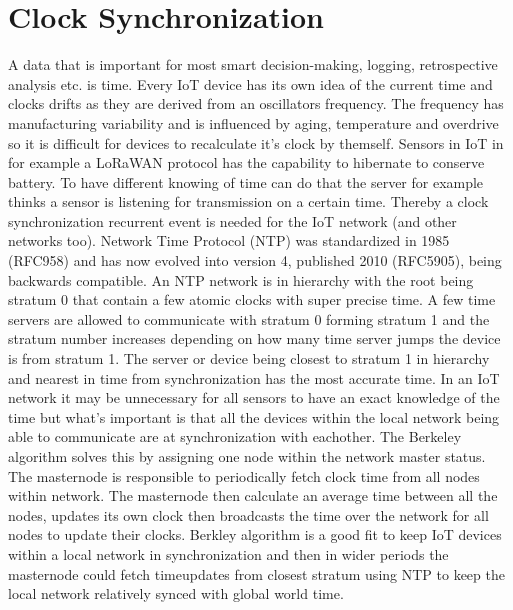 \documentclass[article,a4paper]{IEEEtran}
\begin{document}
\section{Clock Synchronization}
A data that is important for most smart decision-making, logging, retrospective analysis etc. is time. Every IoT device has its own idea of the current time and clocks drifts as they are derived from an oscillators frequency. The frequency has manufacturing variability and is influenced by aging, temperature and overdrive so it is difficult for devices to recalculate it's clock by themself. Sensors in IoT in for example a LoRaWAN protocol has the capability to hibernate to conserve battery. To have different knowing of time can do that the server for example thinks a sensor is listening for transmission on a certain time. Thereby a clock synchronization recurrent event is needed for the IoT network (and other networks too).   
\newline\newline 
Network Time Protocol (NTP) \cite{NTPv4} was standardized in 1985 (RFC958) and has now evolved into version 4, published 2010 (RFC5905), being backwards compatible. An NTP network is in hierarchy with the root being stratum 0 that contain a few atomic clocks with super precise time. A few time servers are allowed to communicate with stratum 0 forming stratum 1 and the stratum number increases depending on how many time server jumps the device is from stratum 1. The server or device being closest to stratum 1 in hierarchy and nearest in time from synchronization has the most accurate time. In an IoT network it may be unnecessary for all sensors to have an exact knowledge of the time but what's important is that all the devices within the local network being able to communicate are at synchronization with eachother. 
\newline\newline
The Berkeley algorithm \cite{Berkleyalgo} solves this by assigning one node within the network master status. The masternode is responsible to periodically fetch clock time from all nodes within network. The masternode then calculate an average time between all the nodes, updates its own clock then broadcasts the time over the network for all nodes to update their clocks. Berkley algorithm is a good fit to keep IoT devices within a local network in synchronization and then in wider periods the masternode could fetch timeupdates from closest stratum using NTP to keep the local network relatively synced with global world time.
\end{document}
